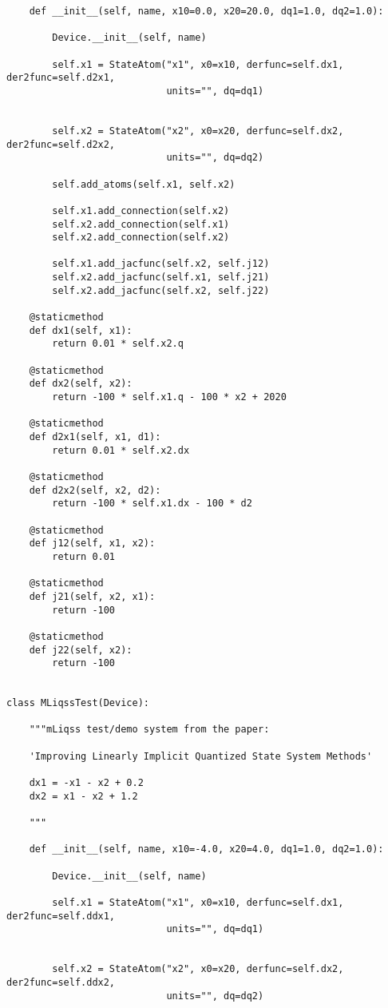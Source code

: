 \begin{lstlisting}
    def __init__(self, name, x10=0.0, x20=20.0, dq1=1.0, dq2=1.0):

        Device.__init__(self, name)

        self.x1 = StateAtom("x1", x0=x10, derfunc=self.dx1, der2func=self.d2x1,
                            units="", dq=dq1)


        self.x2 = StateAtom("x2", x0=x20, derfunc=self.dx2, der2func=self.d2x2,
                            units="", dq=dq2)

        self.add_atoms(self.x1, self.x2)

        self.x1.add_connection(self.x2)
        self.x2.add_connection(self.x1)
        self.x2.add_connection(self.x2)

        self.x1.add_jacfunc(self.x2, self.j12)
        self.x2.add_jacfunc(self.x1, self.j21)
        self.x2.add_jacfunc(self.x2, self.j22)

    @staticmethod
    def dx1(self, x1):
        return 0.01 * self.x2.q

    @staticmethod
    def dx2(self, x2):
        return -100 * self.x1.q - 100 * x2 + 2020

    @staticmethod
    def d2x1(self, x1, d1):
        return 0.01 * self.x2.dx

    @staticmethod
    def d2x2(self, x2, d2):
        return -100 * self.x1.dx - 100 * d2

    @staticmethod
    def j12(self, x1, x2):
        return 0.01

    @staticmethod
    def j21(self, x2, x1):
        return -100

    @staticmethod
    def j22(self, x2):
        return -100


class MLiqssTest(Device):

    """mLiqss test/demo system from the paper:

    'Improving Linearly Implicit Quantized State System Methods'

    dx1 = -x1 - x2 + 0.2
    dx2 = x1 - x2 + 1.2

    """

    def __init__(self, name, x10=-4.0, x20=4.0, dq1=1.0, dq2=1.0):

        Device.__init__(self, name)

        self.x1 = StateAtom("x1", x0=x10, derfunc=self.dx1, der2func=self.ddx1,
                            units="", dq=dq1)


        self.x2 = StateAtom("x2", x0=x20, derfunc=self.dx2, der2func=self.ddx2,
                            units="", dq=dq2)


\end{lstlisting}

